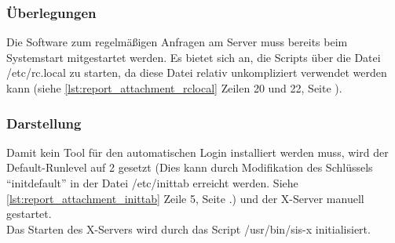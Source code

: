\subsubsection{Überlegungen}

Die Software zum regelmäßigen Anfragen am Server muss bereits beim Systemstart mitgestartet werden. Es bietet sich an, die Scripts über die Datei /etc/rc.local zu starten, da diese Datei relativ unkompliziert verwendet werden kann (siehe  \autoref{lst:report_attachment_rclocal} Zeilen 20 und 22, Seite \pageref{lst:report_attachment_rclocal}).\\

\subsubsection{Darstellung}

Damit kein Tool für den automatischen Login installiert werden muss, wird der Default-Runlevel auf 2 gesetzt (Dies kann durch Modifikation des Schlüssels \enquote{initdefault} in der Datei /etc/inittab erreicht werden. Siehe \autoref{lst:report_attachment_inittab} Zeile 5, Seite \pageref{lst:report_attachment_inittab}.) und der X-Server manuell gestartet.\\
Das Starten des X-Servers wird durch das Script /usr/bin/sis-x initialisiert.



